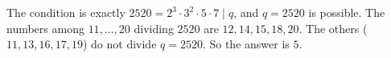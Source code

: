 The condition is exactly $2520=2^3\cdot3^2\cdot5\cdot7\mid q$, and $q=2520$ is possible. The numbers among $11,\dots,20$ dividing $2520$ are $12,14,15,18,20$. The others ($11,13,16,17,19$) do not divide $q=2520$. So the answer is $\boxed{5}$.

